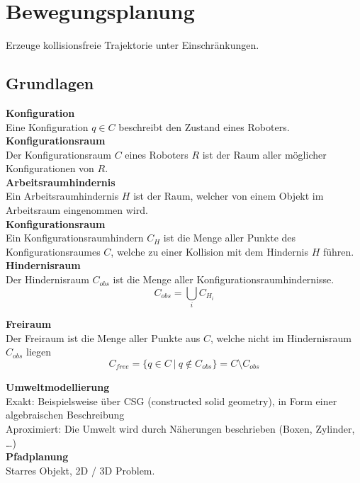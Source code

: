 

\section{Bewegungsplanung}
Erzeuge kollisionsfreie Trajektorie unter Einschränkungen.

\subsection{Grundlagen}
\textbf{Konfiguration}\\
Eine Konfiguration \(q \in C\) beschreibt den Zustand eines Roboters.\\

\textbf{Konfigurationsraum}\\
Der Konfigurationsraum \(C\) eines Roboters \(R\) ist der Raum aller möglicher Konfigurationen von \(R\).\\

\textbf{Arbeitsraumhindernis}\\
Ein Arbeitsraumhindernis \(H\) ist der Raum, welcher von einem Objekt im Arbeitsraum eingenommen wird.\\

\textbf{Konfigurationsraum}\\
Ein Konfigurationsraumhindern \(C_H\) ist die Menge aller Punkte des Konfigurationsraumes \(C\),
welche zu einer Kollision mit dem Hindernis \(H\) führen.\\

\textbf{Hindernisraum}\\
Der Hindernisraum \(C_{\mathit{obs}}\) ist die Menge aller Konfigurationsraumhindernisse.
\[C_{\mathit{obs}} = \bigcup_i C_{H_i} \]

\textbf{Freiraum}\\
Der Freiraum ist die Menge aller Punkte aus \(C\), welche nicht im Hindernisraum \(C_{\mathit{obs}}\) liegen
\[C_{\mathit{free}} = \{q \in C\ |\ q \not \in C_{\mathit{obs}}\} = C \setminus C_{\mathit{obs}}\]

\textbf{Umweltmodellierung}\\
Exakt: Beispielsweise über CSG (constructed solid geometry), in Form einer algebraischen Beschreibung\\
Aproximiert: Die Umwelt wird durch Näherungen beschrieben (Boxen, Zylinder, \ldots)\\

\textbf{Pfadplanung}\\
Starres Objekt, 2D / 3D Problem.\\

